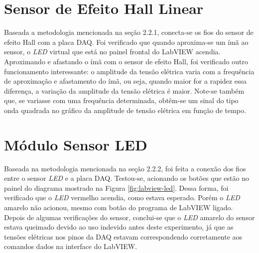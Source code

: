 \documentclass[a4paper]{instrumentacao}
\begin{document}








\section{Sensor de Efeito Hall Linear}
Baseada a metodologia mencionada na seção 2.2.1, conecta-se os fios do sensor de efeito Hall com a placa DAQ. Foi verificado que quando aproxima-se um ímã ao sensor, o \textit{LED} virtual que está no painel frontal do LabVIEW acendia. Aproximando e afastando o ímã com o sensor de efeito Hall, foi verificado outro funcionamento interessante: o amplitude da tensão elétrica varia com a frequência de aproximação e afastamento do ímã, ou seja, quando maior for a rapidez essa diferença, a variação da amplitude
da tensão elétrica é maior. Note-se também que, se variasse com uma frequência determinada, obtêm-se um sinal do tipo onda quadrada no gráfico da amplitude de tensão elétrica em função de tempo.

\section{Módulo Sensor LED}
Baseada na metodologia mencionada na seção 2.2.2, foi feita a conexão dos fios  entre o sensor \textit{LED} e a placa DAQ. Testou-se, acionando os botões que estão no painel do diagrama mostrado na Figura \ref{fig:labview-led}. Dessa forma, foi verificado que o \textit{LED} vermelho acendia, como estava esperado. Porém o \textit{LED} amarelo não acionou, mesmo com botão do programa de LabVIEW ligado. Depois de algumas verificações do sensor, conclui-se que o \textit{LED} amarelo do sensor estava queimado devido ao uso indevido antes deste experimento, já que as tensões elétricas nos pinos da DAQ estavam correspondendo corretamente aos comandos dados na interface do LabVIEW.
\end{document}
